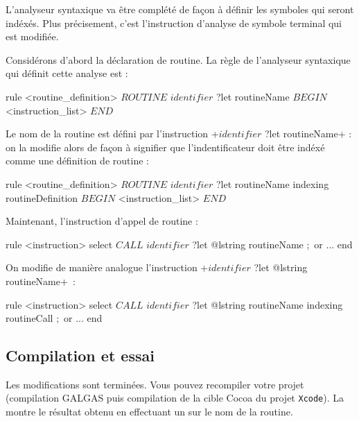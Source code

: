 L'analyseur syntaxique va être complété de façon à définir les symboles qui seront indéxés. Plus précisement, c'est l'instruction d'analyse de symbole terminal qui est modifiée.

Considérons d'abord la déclaration de routine. La règle de l'analyseur syntaxique qui définit cette analyse est :

\begin{galgas}
rule <routine_definition> {
  $ROUTINE$
  $identifier$ ?let routineName
  $BEGIN$
  <instruction_list>
  $END$
}
\end{galgas}

Le nom de la routine est défini par l'instruction \ggs+$identifier$ ?let routineName+ : on la modifie alors de façon à signifier que l'indentificateur doit être indéxé comme une définition de routine :

\begin{galgas}
rule <routine_definition> {
  $ROUTINE$
  $identifier$ ?let routineName indexing routineDefinition
  $BEGIN$
  <instruction_list>
  $END$
}
\end{galgas}

Maintenant, l'instruction d'appel de routine :

\begin{galgas}
rule <instruction> {
  select
    $CALL$
    $identifier$ ?let @lstring routineName
    $;$
  or
    ...
  end
}
\end{galgas}

On modifie de manière analogue l'instruction \ggs+$identifier$ ?let @lstring routineName+~:

\begin{galgas}
rule <instruction> {
  select
    $CALL$
    $identifier$ ?let @lstring routineName indexing routineCall
    $;$
  or
    ...
  end
}
\end{galgas}



\subsection{Compilation et essai}

Les modifications sont terminées. Vous pouvez recompiler votre projet (compilation GALGAS puis compilation de la cible Cocoa du projet \texttt{Xcode}). La  montre le résultat obtenu en effectuant un  sur le nom de la routine.

